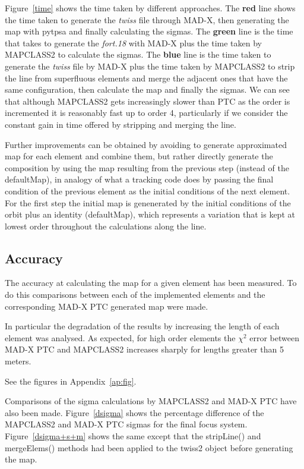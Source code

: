 \documentclass[a4paper]{cernatsnote}
\begin{document}
Figure~\ref{time} shows the time taken by different approaches. The
\textbf{red} line shows the time taken to generate the \textit{twiss}
file through MAD-X, then generating the map with pytpsa and finally
calculating the sigmas. The \textbf{green} line is the time that takes
to generate the \textit{fort.18} with MAD-X plus the time taken by
\textsc{MAPCLASS2} to calculate the sigmas. The \textbf{blue} line is
the time taken to generate the \textit{twiss} file by MAD-X plus the
time taken by \textsc{MAPCLASS2} to strip the line from superfluous
elements and merge the adjacent ones that have the same configuration, then
calculate the map and finally the sigmas. We can see that
although \textsc{MAPCLASS2} gets increasingly slower than PTC as the order is
incremented it is reasonably fast up to order 4, particularly if we consider
the constant gain in time offered by stripping and merging the line.

Further improvements can be obtained by avoiding to generate approximated map
for each element and combine them, but rather directly generate the
composition by using the map resulting from the previous step (instead of the
defaultMap), in analogy of what a tracking code does by passing the final
condition of the previous element as the initial conditions of the next
element. For the first step the initial map is genenerated by the initial
conditions of the orbit plus an identity (defaultMap), which represents a
variation that is kept at lowest order throughout the calculations along the
line.

\subsection{Accuracy}
\label{sec:accuracy}

The accuracy at calculating the map for a given element has been
measured. To do this comparisons between each of the implemented
elements and the corresponding MAD-X PTC generated map were made.

In particular the degradation of the results by increasing the length
of each element was analysed. As expected, for high order elements the
$\chi^2$ error between MAD-X PTC and \textsc{MAPCLASS2} increases
sharply for lengths greater than 5 meters.

See the figures in Appendix~\ref{ap:fig}.

Comparisons of the sigma calculations by \textsc{MAPCLASS2} and
\textsc{MAD-X PTC} have also been made. Figure~\ref{dsigma} shows the
percentage difference of the \textsc{MAPCLASS2} and \textsc{MAD-X PTC}
sigmas for the final focus system. Figure~\ref{dsigma+s+m} shows the
same except that the stripLine() and mergeElems() methods had been
applied to the twiss2 object before generating the map.
\end{document}
